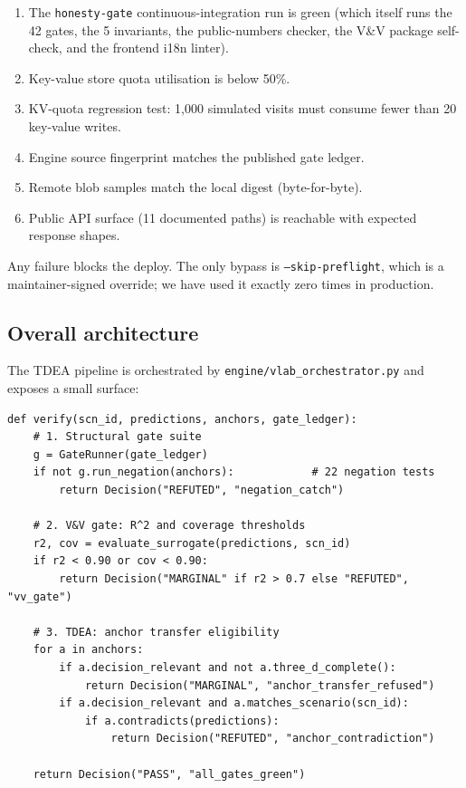 \documentclass[review,3p]{elsarticle}
\begin{document}
\begin{enumerate}
    \item The \texttt{honesty-gate} continuous-integration run is green (which itself runs the 42 gates, the 5 invariants, the public-numbers checker, the V\&V package self-check, and the frontend i18n linter).
    \item Key-value store quota utilisation is below 50\%.
    \item KV-quota regression test: 1{,}000 simulated visits must consume fewer than 20 key-value writes.
    \item Engine source fingerprint matches the published gate ledger.
    \item Remote blob samples match the local digest (byte-for-byte).
    \item Public API surface (11 documented paths) is reachable with expected response shapes.
\end{enumerate}

Any failure blocks the deploy. The only bypass is \texttt{--skip-preflight}, which is a maintainer-signed override; we have used it exactly zero times in production.

\subsection{Overall architecture}
\label{sec:arch}

The TDEA pipeline is orchestrated by \texttt{engine/vlab\_orchestrator.py} and exposes a small surface:

\begin{lstlisting}[style=python,caption={TDEA decision entry point.},label={lst:orchestrator}]
def verify(scn_id, predictions, anchors, gate_ledger):
    # 1. Structural gate suite
    g = GateRunner(gate_ledger)
    if not g.run_negation(anchors):            # 22 negation tests
        return Decision("REFUTED", "negation_catch")

    # 2. V&V gate: R^2 and coverage thresholds
    r2, cov = evaluate_surrogate(predictions, scn_id)
    if r2 < 0.90 or cov < 0.90:
        return Decision("MARGINAL" if r2 > 0.7 else "REFUTED", "vv_gate")

    # 3. TDEA: anchor transfer eligibility
    for a in anchors:
        if a.decision_relevant and not a.three_d_complete():
            return Decision("MARGINAL", "anchor_transfer_refused")
        if a.decision_relevant and a.matches_scenario(scn_id):
            if a.contradicts(predictions):
                return Decision("REFUTED", "anchor_contradiction")

    return Decision("PASS", "all_gates_green")
\end{lstlisting}
\end{document}
